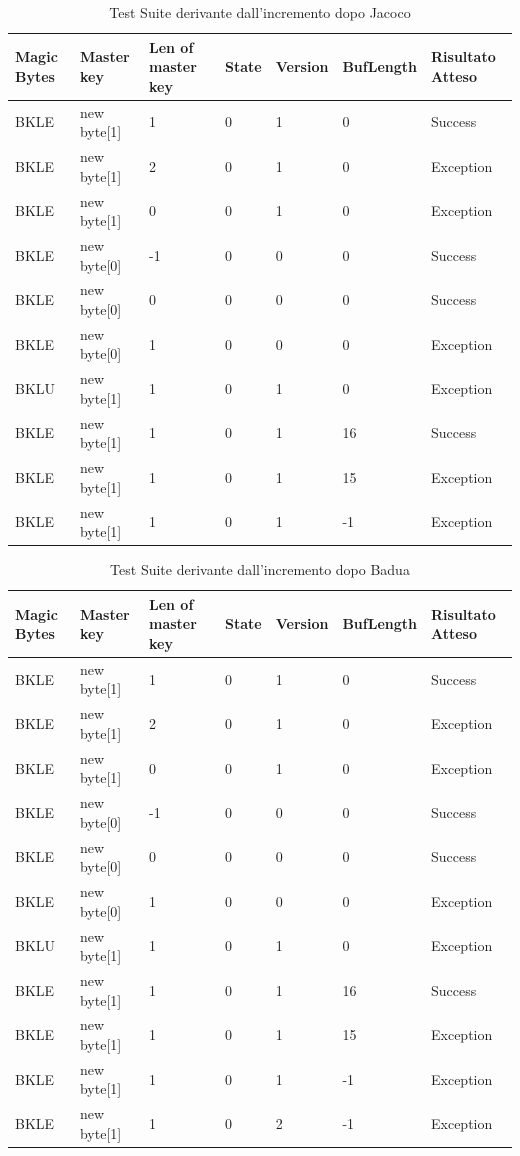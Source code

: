\documentclass[12pt, a4paper]{article}
\begin{document}
\begin{table}[ht]
  \centering
  \caption[FileInfo: Test Suite - Adequacy Control Flow]{Test Suite derivante dall'incremento dopo Jacoco}
  \begin{tabular}{|l|l|l|l|l|l|l|}
    \hline
    \textbf{Magic Bytes} & \textbf{Master key} & \textbf{Len of master key}  & \textbf{State} & \textbf{Version} & \textbf{BufLength} & \textbf{Risultato Atteso} \\
    \hline
    BKLE & new byte[1] & 1 & 0 & 1 & 0 & Success \\
    BKLE & new byte[1] & 2 & 0 & 1 & 0 & Exception \\
    BKLE & new byte[1] & 0 & 0 & 1 & 0 & Exception \\
    BKLE & new byte[0] & -1 & 0 & 0 & 0 & Success \\
    BKLE & new byte[0] & 0 & 0 & 0 & 0 & Success \\
    BKLE & new byte[0] & 1 & 0 & 0 & 0 & Exception \\
    BKLU & new byte[1] & 1 & 0 & 1 & 0 & Exception \\
    BKLE & new byte[1] & 1 & 0 & 1 & 16 & Success \\
    BKLE & new byte[1] & 1 & 0 & 1 & 15 & Exception \\
    BKLE & new byte[1] & 1 & 0 & 1 & -1 & Exception \\
    \hline
  \end{tabular}
  \label{tab:categoryPartition1ReadHeader2}
\end{table}

\begin{table}[ht]
  \centering
  \caption[FileInfo: Test Suite - Adequacy Data Flow]{Test Suite derivante dall'incremento dopo Badua}
  \begin{tabular}{|l|l|l|l|l|l|l|}
    \hline
    \textbf{Magic Bytes} & \textbf{Master key} & \textbf{Len of master key}  & \textbf{State} & \textbf{Version} & \textbf{BufLength} & \textbf{Risultato Atteso} \\
    \hline
    BKLE & new byte[1] & 1 & 0 & 1 & 0 & Success \\
    BKLE & new byte[1] & 2 & 0 & 1 & 0 & Exception \\
    BKLE & new byte[1] & 0 & 0 & 1 & 0 & Exception \\
    BKLE & new byte[0] & -1 & 0 & 0 & 0 & Success \\
    BKLE & new byte[0] & 0 & 0 & 0 & 0 & Success \\
    BKLE & new byte[0] & 1 & 0 & 0 & 0 & Exception \\
    BKLU & new byte[1] & 1 & 0 & 1 & 0 & Exception \\
    BKLE & new byte[1] & 1 & 0 & 1 & 16 & Success \\
    BKLE & new byte[1] & 1 & 0 & 1 & 15 & Exception \\
    BKLE & new byte[1] & 1 & 0 & 1 & -1 & Exception \\
    BKLE & new byte[1] & 1 & 0 & 2 & -1 & Exception \\
    \hline
  \end{tabular}
  \label{tab:ADF1ReadHeader}
\end{table}
\end{document}
